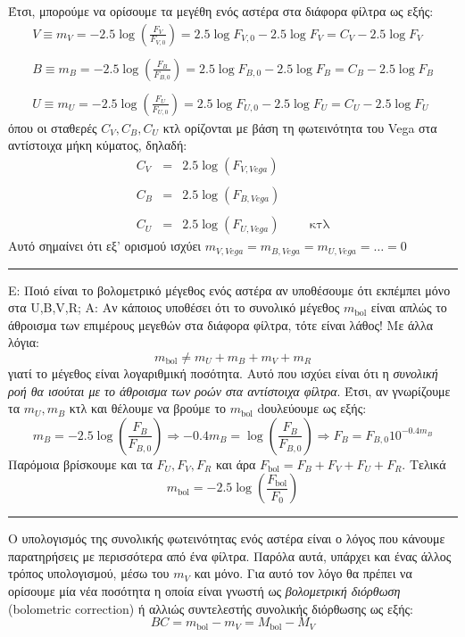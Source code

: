 Έτσι, μπορούμε να ορίσουμε τα μεγέθη ενός αστέρα στα διάφορα φίλτρα ως εξής:
\begin{eqnarray*}
    V \equiv m_V = -2.5 \log \left( \frac{F_V}{F_{V,0}} \right) = 2.5 \log F_{V,0} - 2.5 \log F_V = C_V - 2.5 \log F_V \\\\
    B \equiv m_B = -2.5 \log \left( \frac{F_B}{F_{B,0}} \right) = 2.5 \log F_{B,0} - 2.5 \log F_B = C_B - 2.5 \log F_B \\\\
    U \equiv m_U = -2.5 \log \left( \frac{F_U}{F_{U,0}} \right) = 2.5 \log F_{U,0} - 2.5 \log F_U = C_U - 2.5 \log F_U 
\end{eqnarray*}
όπου οι σταθερές $C_V, C_B, C_U$ κτλ ορίζονται με βάση τη φωτεινότητα του Vega στα αντίστοιχα μήκη κύματος, δηλαδή:
\begin{eqnarray*}
    C_V  &=& 2.5 \log(F_{V, Vega}) \\\\
    C_B  &=& 2.5 \log(F_{B, Vega}) \\\\
    C_U  &=& 2.5 \log(F_{U, Vega}) \hspace{1cm} \text{κτλ}
\end{eqnarray*}
Αυτό σημαίνει ότι εξ' ορισμού ισχύει $\boxed{m_{V,Vega} = m_{B,Vega} = m_{U,Vega} = \dots = 0}$
\\
{\color{red} \hrule} 
Ε: Ποιό είναι το βολομετρικό μέγεθος ενός αστέρα αν υποθέσουμε ότι εκπέμπει μόνο στα U,B,V,R;
Α: Αν κάποιος υποθέσει ότι το συνολικό μέγεθος $m_{\text{bol}}$ είναι απλώς το άθροισμα των επιμέρους μεγεθών στα διάφορα φίλτρα, τότε είναι λάθος! Με άλλα λόγια: $$m_{\text{bol}} \neq m_U + m_B + m_V + m_R$$
γιατί το μέγεθος είναι λογαριθμική ποσότητα. Αυτό που ισχύει είναι ότι η \textit{συνολική ροή θα ισούται με το άθροισμα των ροών στα αντίστοιχα φίλτρα}. Έτσι, αν γνωρίζουμε τα $m_U, m_B$ κτλ και θέλουμε να βρούμε το $m_{\text{bol}}$ dουλεύουμε ως εξής:
$$m_B = -2.5 \log \left( \frac{F_B}{F_{B,0}} \right) \Rightarrow -0.4m_B = \log \left( \frac{F_B}{F_{B,0}} \right) \Rightarrow F_B = F_{B,0} 10^{-0.4m_B}$$
Παρόμοια βρίσκουμε και τα $F_U, F_V, F_R$ και άρα $F_{\text{bol}} = F_B+F_V+F_U+F_R$. Τελικά $$m_{\text{bol}} = -2.5 \log \left( \frac{F_{\text{bol}}}{F_0} \right)$$
{\color{red} \hrule} 

Ο υπολογισμός της συνολικής φωτεινότητας ενός αστέρα είναι ο λόγος που κάνουμε παρατηρήσεις με περισσότερα από ένα φίλτρα. Παρόλα αυτά, υπάρχει και ένας άλλος τρόπος υπολογισμού, μέσω του $m_V$ και μόνο. Για αυτό τον λόγο θα πρέπει να ορίσουμε μία νέα ποσότητα η οποία είναι γνωστή ως \textit{βολομετρική διόρθωση} (bolometric correction) ή αλλιώς συντελεστής συνολικής διόρθωσης ως εξής:
\begin{equation}
    \boxed{BC = m_{\text{bol}} - m_V = M_{\text{bol}} - M_V}
\end{equation}

